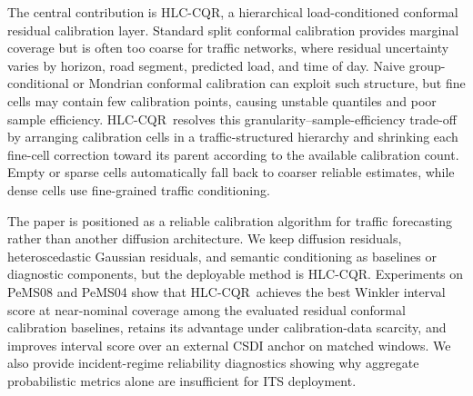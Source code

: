 \documentclass[letterpaper,journal]{IEEEtran}
\newcommand{\hlc}{HLC-CQR}
\begin{document}
The central contribution is \hlc, a hierarchical load-conditioned conformal residual calibration layer. Standard split conformal calibration provides marginal coverage but is often too coarse for traffic networks, where residual uncertainty varies by horizon, road segment, predicted load, and time of day. Naive group-conditional or Mondrian conformal calibration can exploit such structure, but fine cells may contain few calibration points, causing unstable quantiles and poor sample efficiency. \hlc\ resolves this granularity--sample-efficiency trade-off by arranging calibration cells in a traffic-structured hierarchy and shrinking each fine-cell correction toward its parent according to the available calibration count. Empty or sparse cells automatically fall back to coarser reliable estimates, while dense cells use fine-grained traffic conditioning.

The paper is positioned as a reliable calibration algorithm for traffic forecasting rather than another diffusion architecture. We keep diffusion residuals, heteroscedastic Gaussian residuals, and semantic conditioning as baselines or diagnostic components, but the deployable method is \hlc. Experiments on PeMS08 and PeMS04 show that \hlc\ achieves the best Winkler interval score at near-nominal coverage among the evaluated residual conformal calibration baselines, retains its advantage under calibration-data scarcity, and improves interval score over an external CSDI anchor on matched windows. We also provide incident-regime reliability diagnostics showing why aggregate probabilistic metrics alone are insufficient for ITS deployment.
\end{document}
